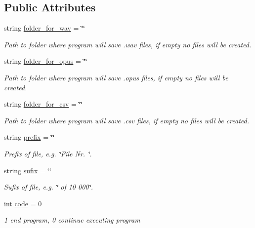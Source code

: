 \subsection*{Public Attributes}
\begin{DoxyCompactItemize}
\item 
string \hyperlink{class_settings_aef224f0e1626351f15eaf48609c4366c}{folder\+\_\+for\+\_\+wav} = \char`\"{}\char`\"{}
\begin{DoxyCompactList}\small\item\em Path to folder where program will save .wav files, if empty no files will be created. \end{DoxyCompactList}\item 
string \hyperlink{class_settings_a37d88dd80178efec8d6146088db70921}{folder\+\_\+for\+\_\+opus} = \char`\"{}\char`\"{}
\begin{DoxyCompactList}\small\item\em Path to folder where program will save .opus files, if empty no files will be created. \end{DoxyCompactList}\item 
string \hyperlink{class_settings_a3dd40bbe4be23e6e9531ccb2db16a41a}{folder\+\_\+for\+\_\+csv} = \char`\"{}\char`\"{}
\begin{DoxyCompactList}\small\item\em Path to folder where program will save .csv files, if empty no files will be created. \end{DoxyCompactList}\item 
string \hyperlink{class_settings_aef15e87bccc305b810277337fa853ab9}{prefix} = \char`\"{}\char`\"{}
\begin{DoxyCompactList}\small\item\em Prefix of file, e.\+g. \char`\"{}\+File Nr. \char`\"{}. \end{DoxyCompactList}\item 
string \hyperlink{class_settings_a784e2b16e9280cc9250b3c4306573b16}{sufix} = \char`\"{}\char`\"{}
\begin{DoxyCompactList}\small\item\em Sufix of file, e.\+g. \char`\"{} of 10 000\char`\"{}. \end{DoxyCompactList}\item 
int \hyperlink{class_settings_a059440ec7c5feac6874fa8836a825da5}{code} = 0
\begin{DoxyCompactList}\small\item\em 1 end program, 0 continue executing program \end{DoxyCompactList}\item 

\end{DoxyCompactItemize}
